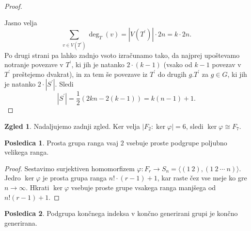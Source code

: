 \documentclass[11pt]{book}
\theoremstyle{definition}
\theoremstyle{zgled}
\newtheorem*{zgled}{Zgled}
\theoremstyle{odprtproblem}
\theoremstyle{domacanaloga}
\newenvironment{dokaz}
    {\color{siva}\begin{proof}}
    {\end{proof}}
\theoremstyle{izrek}
\newtheorem*{posledica}{Posledica}
\begin{document}
\begin{dokaz}
\begin{figure}[h]
\end{figure}

Jasno velja
\[
\sum_{v \in V(T^\prime)} \deg_T(v) = |V(T^\prime)| \cdot 2n = k \cdot 2n.
\]
Po drugi strani pa lahko zadnjo vsoto izračunamo tako, da najprej upoštevamo notranje povezave v $T^\prime$, ki jih je natanko $2 \cdot (k-1)$ (vsako od $k-1$ povezav v $T^\prime$ preštejemo dvakrat), in za tem še povezave iz $T^\prime$ do drugih $g.T^\prime$ za $g \in G$, ki jih je natanko $2 \cdot |S^\prime|$. Sledi
\[
|S^\prime| = \frac12 (2kn - 2(k-1)) = k(n-1) + 1.
\]
\end{dokaz}

\begin{zgled}
Nadaljujemo zadnji zgled. Ker velja $|F_2:\ker \varphi| = 6$, sledi $\ker \varphi \cong F_7$.
\end{zgled}





\begin{posledica}
Prosta grupa ranga vsaj $2$ vsebuje proste podgrupe poljubno velikega ranga.
\end{posledica}

\begin{dokaz}
Sestavimo surjektiven homomorfizem $\varphi \colon F_r \to S_n = \langle (1 \ 2), (1 \ 2 \ \cdots \ n) \rangle$. Jedro $\ker \varphi$ je prosta grupa ranga $n! \cdot (r-1) + 1$, kar raste čez vse meje ko gre $n \to \infty$. Hkrati $\ker \varphi$ vsebuje proste grupe vsakega ranga manjšega od $n! (r - 1) + 1$.
\end{dokaz}

\begin{posledica}
Podgrupa končnega indeksa v končno generirani grupi je končno generirana.
\end{posledica}
\end{document}
